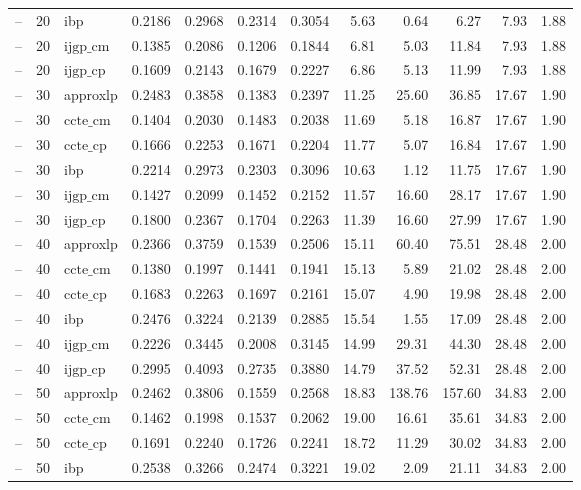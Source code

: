 \begin{table}[ht]
\begin{tabular}{lrlrrrrrrrrr}
-- & 20 & ibp & 0.2186 & 0.2968 & 0.2314 & 0.3054 & 5.63 & 0.64 & 6.27 & 7.93 & 1.88 \\
-- & 20 & $\text{ijgp\_cm}$ & 0.1385 & 0.2086 & 0.1206 & 0.1844 & 6.81 & 5.03 & 11.84 & 7.93 & 1.88 \\
-- & 20 & $\text{ijgp\_cp}$ & 0.1609 & 0.2143 & 0.1679 & 0.2227 & 6.86 & 5.13 & 11.99 & 7.93 & 1.88 \\
-- & 30 & approxlp & 0.2483 & 0.3858 & 0.1383 & 0.2397 & 11.25 & 25.60 & 36.85 & 17.67 & 1.90 \\
-- & 30 & $\text{ccte\_cm}$ & 0.1404 & 0.2030 & 0.1483 & 0.2038 & 11.69 & 5.18 & 16.87 & 17.67 & 1.90 \\
-- & 30 & $\text{ccte\_cp}$ & 0.1666 & 0.2253 & 0.1671 & 0.2204 & 11.77 & 5.07 & 16.84 & 17.67 & 1.90 \\
-- & 30 & ibp & 0.2214 & 0.2973 & 0.2303 & 0.3096 & 10.63 & 1.12 & 11.75 & 17.67 & 1.90 \\
-- & 30 & $\text{ijgp\_cm}$ & 0.1427 & 0.2099 & 0.1452 & 0.2152 & 11.57 & 16.60 & 28.17 & 17.67 & 1.90 \\
-- & 30 & $\text{ijgp\_cp}$ & 0.1800 & 0.2367 & 0.1704 & 0.2263 & 11.39 & 16.60 & 27.99 & 17.67 & 1.90 \\
-- & 40 & approxlp & 0.2366 & 0.3759 & 0.1539 & 0.2506 & 15.11 & 60.40 & 75.51 & 28.48 & 2.00 \\
-- & 40 & $\text{ccte\_cm}$ & 0.1380 & 0.1997 & 0.1441 & 0.1941 & 15.13 & 5.89 & 21.02 & 28.48 & 2.00 \\
-- & 40 & $\text{ccte\_cp}$ & 0.1683 & 0.2263 & 0.1697 & 0.2161 & 15.07 & 4.90 & 19.98 & 28.48 & 2.00 \\
-- & 40 & ibp & 0.2476 & 0.3224 & 0.2139 & 0.2885 & 15.54 & 1.55 & 17.09 & 28.48 & 2.00 \\
-- & 40 & $\text{ijgp\_cm}$ & 0.2226 & 0.3445 & 0.2008 & 0.3145 & 14.99 & 29.31 & 44.30 & 28.48 & 2.00 \\
-- & 40 & $\text{ijgp\_cp}$ & 0.2995 & 0.4093 & 0.2735 & 0.3880 & 14.79 & 37.52 & 52.31 & 28.48 & 2.00 \\
-- & 50 & approxlp & 0.2462 & 0.3806 & 0.1559 & 0.2568 & 18.83 & 138.76 & 157.60 & 34.83 & 2.00 \\
-- & 50 & $\text{ccte\_cm}$ & 0.1462 & 0.1998 & 0.1537 & 0.2062 & 19.00 & 16.61 & 35.61 & 34.83 & 2.00 \\
-- & 50 & $\text{ccte\_cp}$ & 0.1691 & 0.2240 & 0.1726 & 0.2241 & 18.72 & 11.29 & 30.02 & 34.83 & 2.00 \\
-- & 50 & ibp & 0.2538 & 0.3266 & 0.2474 & 0.3221 & 19.02 & 2.09 & 21.11 & 34.83 & 2.00 \\

\end{tabular}
\end{table}
